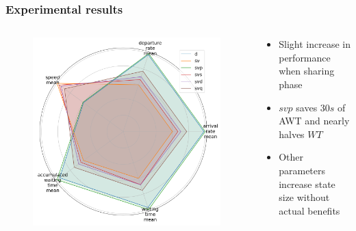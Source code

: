\documentclass[dvipsnames]{beamer}
\begin{document}
\begin{frame}
\frametitle{Experimental results}
  \begin{columns}
  \begin{column}{0.5\textwidth}
    \begin{figure}
      \centering
      \includegraphics[width=1.0\textwidth]{figures/obs-sharing-radar.png}
    \end{figure}
  \end{column}
  \begin{column}{0.5\textwidth}
    \begin{itemize}
      \item Slight increase in performance when sharing phase
      \item $svp$ saves $30s$ of AWT and nearly halves $WT$
      \item Other parameters increase state size without actual benefits
    \end{itemize}
  \end{column}
\end{columns}
\end{frame}
\end{document}

